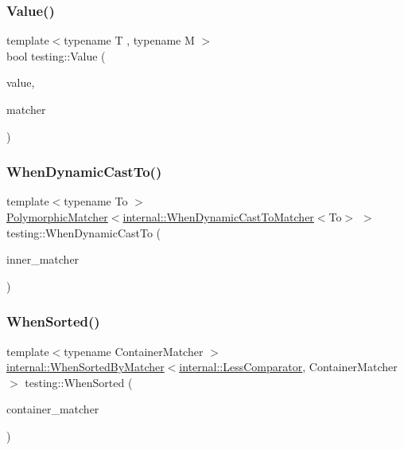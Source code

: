 \subsubsection{\texorpdfstring{Value()}{Value()}}
{\footnotesize\ttfamily template$<$typename T , typename M $>$ \\
bool testing\+::\+Value (\begin{DoxyParamCaption}\item[{const T \&}]{value,  }\item[{M}]{matcher }\end{DoxyParamCaption})\hspace{0.3cm}{\ttfamily [inline]}}

\mbox{\label{namespacetesting_aabfc320cc132d0a1da2a255b45a17b7a}} 
\subsubsection{\texorpdfstring{When\+Dynamic\+Cast\+To()}{WhenDynamicCastTo()}}
{\footnotesize\ttfamily template$<$typename To $>$ \\
\hyperlink{classtesting_1_1_polymorphic_matcher}{Polymorphic\+Matcher}$<$\hyperlink{classtesting_1_1internal_1_1_when_dynamic_cast_to_matcher}{internal\+::\+When\+Dynamic\+Cast\+To\+Matcher}$<$To$>$ $>$ testing\+::\+When\+Dynamic\+Cast\+To (\begin{DoxyParamCaption}\item[{const \hyperlink{classtesting_1_1_matcher}{Matcher}$<$ To $>$ \&}]{inner\+\_\+matcher }\end{DoxyParamCaption})\hspace{0.3cm}{\ttfamily [inline]}}

\mbox{\label{namespacetesting_a01468e3e641c72a2efb605b4c34675ee}} 
\subsubsection{\texorpdfstring{When\+Sorted()}{WhenSorted()}}
{\footnotesize\ttfamily template$<$typename Container\+Matcher $>$ \\
\hyperlink{classtesting_1_1internal_1_1_when_sorted_by_matcher}{internal\+::\+When\+Sorted\+By\+Matcher}$<$\hyperlink{structtesting_1_1internal_1_1_less_comparator}{internal\+::\+Less\+Comparator}, Container\+Matcher$>$ testing\+::\+When\+Sorted (\begin{DoxyParamCaption}\item[{const Container\+Matcher \&}]{container\+\_\+matcher }\end{DoxyParamCaption})\hspace{0.3cm}{\ttfamily [inline]}}

